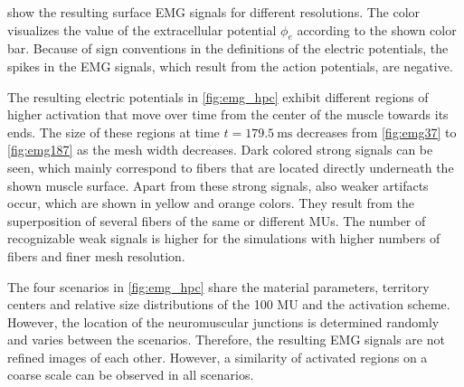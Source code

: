  show the resulting surface EMG signals for different resolutions. The color visualizes the value of the extracellular potential $\phi_e$ according to the shown color bar. Because of sign conventions in the definitions of the electric potentials, the spikes in the EMG signals, which result from the action potentials, are negative.

The resulting electric potentials in \cref{fig:emg_hpc} exhibit different regions of higher activation that move over time from the center of the muscle towards its ends. The size of these regions at time ${t=\SI{179.5}{\ms}}$ decreases from \cref{fig:emg37} to \cref{fig:emg187} as the mesh width decreases. 
Dark colored strong signals can be seen, which mainly correspond to fibers that are located directly underneath the shown muscle surface.
Apart from these strong signals, also weaker artifacts occur, which are shown in yellow and orange colors. They result from the superposition of several fibers of the same or different MUs. The number of recognizable weak signals is higher for the simulations with higher numbers of fibers and finer mesh resolution.

The four scenarios in \cref{fig:emg_hpc} share the material parameters, territory centers and relative size distributions of the 100 MU and the activation scheme. However, the location of the neuromuscular junctions is determined randomly and varies between the scenarios. Therefore, the resulting EMG signals are not refined images of each other.  However, a similarity of activated regions on a coarse scale can be observed in all scenarios.

